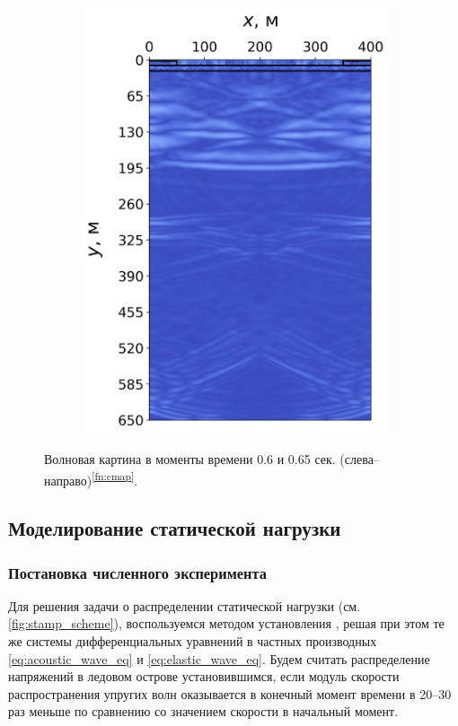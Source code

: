\begin{figure}[H]
\begin{subfigure}{0.49\textwidth}
        \includegraphics[width=\textwidth]{images/gas_field/013000.png}
    \end{subfigure}
    \caption{Волновая картина в моменты времени 0.6 и 0.65 сек. (слева--направо)\textsuperscript{\ref{fn:cmap}}.}
    \label{fig:wave_image_3}
\end{figure}

\subsection{Моделирование статической нагрузки}

\subsubsection{Постановка численного эксперимента}

Для решения задачи о распределении статической нагрузки (см. \autoref{fig:stamp_scheme}), воспользуемся методом установления \cite{fedorenko_relaxation}, решая при этом те же системы дифференциальных уравнений в частных производных \eqref{eq:acoustic_wave_eq} и \eqref{eq:elastic_wave_eq}. Будем считать распределение напряжений в ледовом острове установившимся, если модуль скорости распространения упругих волн оказывается в конечный момент времени в 20--30 раз меньше по сравнению со значением скорости в начальный момент.

